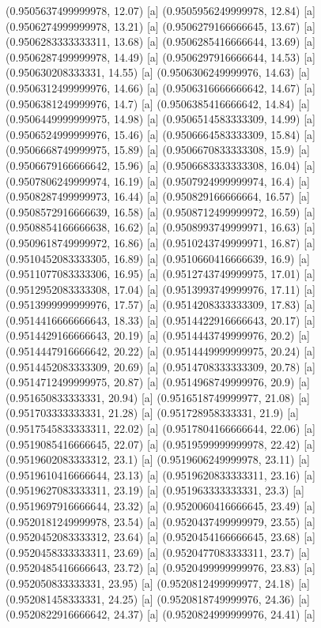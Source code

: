 {{{(0.9505637499999978, 12.07) [a] 
(0.9505956249999978, 12.84) [a] 
(0.9506274999999978, 13.21) [a] 
(0.9506279166666645, 13.67) [a] 
(0.9506283333333311, 13.68) [a] 
(0.9506285416666644, 13.69) [a] 
(0.9506287499999978, 14.49) [a] 
(0.9506297916666644, 14.53) [a] 
(0.950630208333331, 14.55) [a] 
(0.9506306249999976, 14.63) [a] 
(0.9506312499999976, 14.66) [a] 
(0.9506316666666642, 14.67) [a] 
(0.9506381249999976, 14.7) [a] 
(0.9506385416666642, 14.84) [a] 
(0.9506449999999975, 14.98) [a] 
(0.9506514583333309, 14.99) [a] 
(0.9506524999999976, 15.46) [a] 
(0.9506664583333309, 15.84) [a] 
(0.9506668749999975, 15.89) [a] 
(0.9506670833333308, 15.9) [a] 
(0.9506679166666642, 15.96) [a] 
(0.9506683333333308, 16.04) [a] 
(0.9507806249999974, 16.19) [a] 
(0.9507924999999974, 16.4) [a] 
(0.9508287499999973, 16.44) [a] 
(0.950829166666664, 16.57) [a] 
(0.9508572916666639, 16.58) [a] 
(0.9508712499999972, 16.59) [a] 
(0.9508854166666638, 16.62) [a] 
(0.9508993749999971, 16.63) [a] 
(0.9509618749999972, 16.86) [a] 
(0.9510243749999971, 16.87) [a] 
(0.9510452083333305, 16.89) [a] 
(0.9510660416666639, 16.9) [a] 
(0.9511077083333306, 16.95) [a] 
(0.9512743749999975, 17.01) [a] 
(0.9512952083333308, 17.04) [a] 
(0.9513993749999976, 17.11) [a] 
(0.9513999999999976, 17.57) [a] 
(0.9514208333333309, 17.83) [a] 
(0.9514416666666643, 18.33) [a] 
(0.9514422916666643, 20.17) [a] 
(0.9514429166666643, 20.19) [a] 
(0.9514443749999976, 20.2) [a] 
(0.9514447916666642, 20.22) [a] 
(0.9514449999999975, 20.24) [a] 
(0.9514452083333309, 20.69) [a] 
(0.9514708333333309, 20.78) [a] 
(0.9514712499999975, 20.87) [a] 
(0.9514968749999976, 20.9) [a] 
(0.951650833333331, 20.94) [a] 
(0.9516518749999977, 21.08) [a] 
(0.951703333333331, 21.28) [a] 
(0.951728958333331, 21.9) [a] 
(0.9517545833333311, 22.02) [a] 
(0.9517804166666644, 22.06) [a] 
(0.9519085416666645, 22.07) [a] 
(0.9519599999999978, 22.42) [a] 
(0.9519602083333312, 23.1) [a] 
(0.9519606249999978, 23.11) [a] 
(0.9519610416666644, 23.13) [a] 
(0.9519620833333311, 23.16) [a] 
(0.9519627083333311, 23.19) [a] 
(0.951963333333331, 23.3) [a] 
(0.9519697916666644, 23.32) [a] 
(0.9520060416666645, 23.49) [a] 
(0.9520181249999978, 23.54) [a] 
(0.9520437499999979, 23.55) [a] 
(0.9520452083333312, 23.64) [a] 
(0.9520454166666645, 23.68) [a] 
(0.9520458333333311, 23.69) [a] 
(0.9520477083333311, 23.7) [a] 
(0.9520485416666643, 23.72) [a] 
(0.9520499999999976, 23.83) [a] 
(0.952050833333331, 23.95) [a] 
(0.9520812499999977, 24.18) [a] 
(0.952081458333331, 24.25) [a] 
(0.9520818749999976, 24.36) [a] 
(0.9520822916666642, 24.37) [a] 
(0.9520824999999976, 24.41) [a] 
}}}
